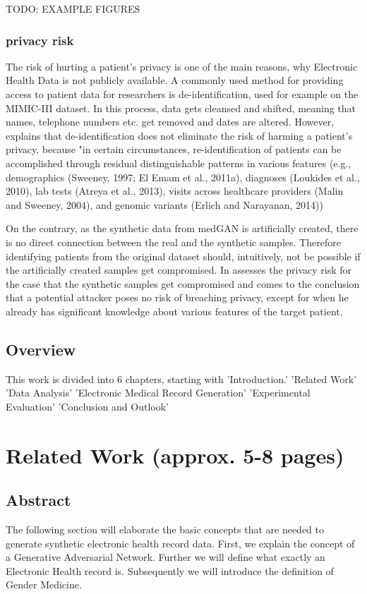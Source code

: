 \documentclass[11pt, a4paper]{book}
\begin{document}
TODO: EXAMPLE FIGURES
\subsection{privacy risk}
The risk of hurting a patient's privacy is one of the main reasons, why Electronic Health Data is not publicly available. A commonly used method for providing access to patient data for researchers is de-identification, used for example on the MIMIC-III dataset. In this process, data gets cleansed and shifted, meaning that names, telephone numbers etc. get removed and dates are altered. \cite{johnson2016mimic}
However, \cite{Choi2017} explains that de-identification does not eliminate the risk of harming a patient's privacy, because "in certain circumstances, re-identification of patients can be accomplished through residual distinguishable patterns in various features (e.g., demographics (Sweeney, 1997; El Emam et al., 2011a), diagnoses (Loukides et al., 2010), lab tests (Atreya et al., 2013), visits across healthcare providers (Malin and Sweeney, 2004), and genomic variants (Erlich and Narayanan, 2014)) \cite{Choi2017}

On the contrary, as the synthetic data from medGAN is artificially created, there is no direct connection between the real and the synthetic samples. Therefore identifying patients from the original dataset should, intuitively, not be possible if the artificially created samples get compromised. In \cite{Choi2017} assesses the privacy risk for the case that the synthetic samples get compromised and comes to the conclusion that a potential attacker poses no risk of breaching privacy, except for when he already has significant knowledge about various features of the target patient.
\section{Overview}
This work is divided into 6 chapters, starting with 'Introduction.'
'Related Work'
'Data Analysis'
'Electronic Medical Record Generation'
'Experimental Evaluation'
'Conclusion and Outlook'
\chapter{Related Work (approx. 5-8 pages)}
\section{Abstract}
The following section will elaborate the basic concepts that are needed to  generate synthetic electronic health record data.
First, we explain the concept of a Generative Adversarial Network. Further we will define what exactly an Electronic Health record is. Subsequently we will introduce the definition of Gender Medicine.
\end{document}
